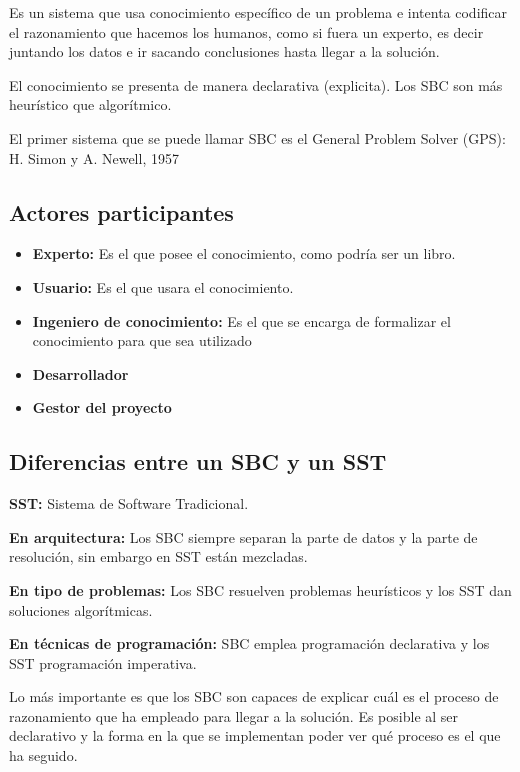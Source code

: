 \documentclass[12pt, twoside, openright]{report} %
\begin{document}
Es un sistema que usa conocimiento específico de un problema e intenta codificar el razonamiento que hacemos los humanos, como si fuera un experto, es decir juntando los datos e ir sacando conclusiones hasta llegar a la solución.

El conocimiento se presenta de manera declarativa (explicita). Los SBC son más heurístico que algorítmico.

El primer sistema que se puede llamar SBC es el General Problem Solver (GPS): H. Simon y A. Newell, 1957

\subsection{Actores participantes}
\begin{itemize}
  \item \textbf{Experto:} Es el que posee el conocimiento, como podría ser un libro.
  \item \textbf{Usuario:} Es el que usara el conocimiento.
  \item \textbf{Ingeniero de conocimiento:} Es el que se encarga de formalizar el conocimiento para que sea utilizado \item \textbf{Desarrollador}
  \item \textbf{Gestor del proyecto}
\end{itemize}

\subsection{Diferencias entre un SBC y un SST}
\textbf{SST:} Sistema de Software Tradicional.

\textbf{En arquitectura:} Los SBC siempre separan la parte de datos y la parte de resolución, sin embargo en SST están mezcladas.

\textbf{En tipo de problemas:} Los SBC resuelven problemas heurísticos y los SST dan soluciones algorítmicas.

\textbf{En técnicas de programación:} SBC emplea programación declarativa y los SST programación imperativa.

Lo más importante es que los SBC son capaces de explicar cuál es el proceso de razonamiento que ha empleado para llegar a la solución. Es posible al ser declarativo y la forma en la que se implementan poder ver qué proceso es el que ha seguido. 
\end{document}
